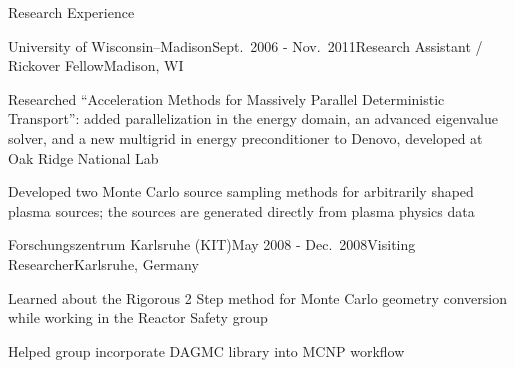 \documentclass{resume3} %
\begin{document}
\begin{rSection}{Research Experience}
\begin{rSubsection}{University of Wisconsin--Madison}{Sept.\ 2006 - Nov.\ 2011}{Research Assistant / Rickover Fellow}{Madison, WI}
\item Researched “Acceleration Methods for Massively Parallel Deterministic Transport”: added parallelization in the energy domain, an advanced eigenvalue solver, and a new multigrid in energy preconditioner to Denovo, developed at Oak Ridge National Lab
\item Developed two Monte Carlo source sampling methods for arbitrarily shaped plasma sources; the sources are generated directly from plasma physics data
\end{rSubsection}




\begin{rSubsection}{Forschungszentrum Karlsruhe (KIT)}{May 2008 - Dec.\ 2008}{Visiting Researcher}{Karlsruhe, Germany}
\item Learned about the Rigorous 2 Step method for Monte Carlo geometry conversion while working in the Reactor Safety group
\item Helped group incorporate DAGMC library into MCNP workflow
\end{rSubsection}




\end{rSection}
\end{document}
